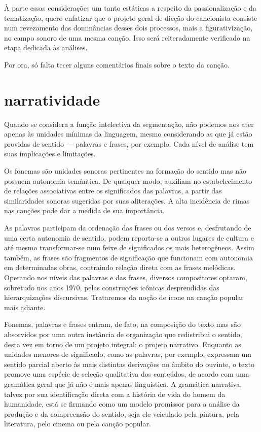À parte essas considerações um tanto estáticas a respeito da
passionalização e da tematização, quero enfatizar que o projeto geral de
dicção do cancionista consiste num revezamento das dominâncias desses
dois processos, mais a figurativização, no campo sonoro de uma mesma
canção. Isso será reiteradamente verificado na etapa dedicada às
análises.

Por ora, só falta tecer alguns comentários finais sobre o texto da
canção.

\section{narratividade}

Quando se considera a função intelectiva da segmentação, não podemos nos
ater apenas às unidades mínimas da linguagem, mesmo considerando as que
já estão providas de sentido --- palavras e frases, por exemplo. Cada
nível de análise tem suas implicações e limitações.

Os fonemas são unidades sonoras pertinentes na formação do sentido mas
não possuem autonomia semântica. De qualquer modo, auxiliam no
estabelecimento de relações associativas entre os significados das
palavras, a partir das similaridades sonoras sugeridas por suas
aliterações. A alta incidência de rimas nas canções pode dar a medida de
sua importância.

As palavras participam da ordenação das frases ou dos versos e,
desfrutando de uma certa autonomia de sentido, podem reporta-se a outros
lugares de cultura e até mesmo transformar-se num feixe de significados
os mais heterogêneos. Assim também, as frases são fragmentos de
significação que funcionam com autonomia em determinadas obras,
contraindo relação direta com as frases melódicas. Operando nos níveis
das palavras e das frases, diversos compositores optaram, sobretudo nos
anos 1970, pelas construções icônicas desprendidas das hierarquizações
discursivas. Trataremos da noção de ícone na canção popular mais
adiante.

Fonemas, palavras e frases entram, de fato, na composição do texto mas
são absorvidos por uma outra instância de organização que redistribui o
sentido, desta vez em torno de um projeto integral: o projeto narrativo.
Enquanto as unidades menores de significado, como as palavras, por
exemplo, expressam um sentido parcial aberto às mais distintas
derivações no âmbito do ouvinte, o texto promove uma espécie de seleção
qualitativa dos conteúdos, de acordo com uma gramática geral que já não
é mais apenas linguística. A gramática narrativa, talvez por sua
identificação direta com a história de vida do homem da humanidade, está
se firmando como um modelo promissor para a análise da produção e da
compreensão do sentido, seja ele veiculado pela pintura, pela
literatura, pelo cinema ou pela canção popular. 

